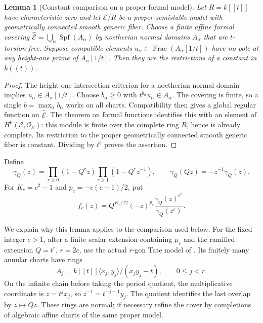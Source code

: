 \documentclass[11pt]{article}
\newtheorem{lemma}[theorem]{Lemma}
\theoremstyle{remark}\newtheorem{remark}[theorem]{Remark}
\begin{document}
\begin{lemma}[Constant comparison on a proper formal model]\label{constant}
Let $R=k[[t]]$ have characteristic zero and let $\mathcal E/R$ be a
proper semistable model with geometrically connected smooth generic
fiber. Choose a finite affine formal covering
$\widehat{\mathcal E}=\bigcup_\alpha\operatorname{Spf}(A_\alpha)$
by noetherian normal domains $A_\alpha$ that are $t$-torsion-free.
Suppose compatible elements
$u_\alpha\in\operatorname{Frac}(A_\alpha[1/t])$ have no pole at any
height-one prime of $A_\alpha[1/t]$. Then they are the restrictions
of a constant in $k((t))$.
\end{lemma}
\begin{proof}
The height-one intersection criterion for a noetherian normal domain
implies $u_\alpha\in A_\alpha[1/t]$. Choose $b_\alpha\geq0$ with
$t^{b_\alpha}u_\alpha\in A_\alpha$. The covering is finite, so a
single $b=\max_\alpha b_\alpha$ works on all charts. Compatibility
then gives a global regular function on $\widehat{\mathcal E}$.
The theorem on formal functions identifies this with an element of
$H^0(\mathcal E,\mathcal O_{\mathcal E})$: this module is finite over
the complete ring $R$, hence is already complete. Its restriction to
the proper geometrically connected smooth generic fiber is constant.
Dividing by $t^b$ proves the assertion.
\end{proof}


Define
\[
 \gamma_Q(z)=\prod_{r\geq0}(1-Q^rz)\prod_{r\geq1}(1-Q^rz^{-1}),
 \qquad \gamma_Q(Qz)=-z^{-1}\gamma_Q(z).
\]
For $K_c=c^2-1$ and $p_c=-c(c-1)/2$, put
\[
 f_c(z)=Q^{K_c/12}(-z)^{p_c}
              \frac{\gamma_Q(z)^{c^2}}{\gamma_Q(z^c)}.
\]

We explain why this lemma applies to the comparison used below.
For the fixed integer $c>1$, after a finite scalar extension containing
$\mu_c$ and the ramified extension $Q=t^r$, $r=2c$, use the actual
$r$-gon Tate model of \cite[Section 2.5]{conrad}. Its finitely many
annular charts have rings
\[
 A_j=k[[t]]\langle x_j,y_j\rangle/(x_jy_j-t),\qquad 0\leq j<r.
\]
On the infinite chain before taking the period quotient, the
multiplicative coordinate is $z=t^jx_j$, so
$z^{-1}=t^{-j-1}y_j$. The quotient identifies the last overlap by
$z\mapsto Qz$. These rings are normal; if necessary refine the cover
by completions of algebraic affine charts of the same proper model.
\end{document}
